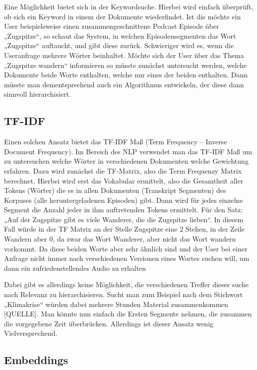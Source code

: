 Eine Möglichkeit bietet sich in der Keywordsuche. 
Hierbei wird einfach überprüft, ob sich ein Keyword in einem der Dokumente wiederfindet. Ist die möchte ein User beispielsweise einen zusammengeschnittene Podcast Episode über „Zugspitze“, so schaut das System, in welchen Episodensegmenten das Wort „Zugspitze“ auftaucht, und gibt diese zurück. 
Schwieriger wird es, wenn die Useranfrage mehrere Wörter beinhaltet. 
Möchte sich der User über das Thema „Zugspitze wandern“ informieren so müsste zunächst untersucht werden, welche Dokumente beide Worte enthalten, welche nur eines der beiden enthalten. 
Dann müsste man dementsprechend auch ein Algorithmus entwickeln, der diese dann sinnvoll hierarchisiert. 

\subsection{TF-IDF}

Einen solchen Ansatz bietet das TF-IDF Maß (Term Frequency – Inverse Document Frequency). 
Im Bereich des NLP verwendet man das TF-IDF Maß um zu untersuchen welche Wörter in verschiedenen Dokumenten welche Gewichtung erfahren. 
Dazu wird zunächst die TF-Matrix, also die Term Frequenzy Matrix berechnet. 
Hierbei wird erst das Vokabular ermittelt, also die Gesamtheit aller Tokens (Wörter) die es in allen Dokumenten (Transkript Segmenten) des Korpuses (alle heruntergeladenen Episoden) gibt. 
Dann wird für jedes einzelne Segment die Anzahl jeder in ihm auftretenden Tokens ermittelt. 
Für den Satz: „Auf der Zugspitze gibt es viele Wanderer, die die Zugspitze lieben“. 
In diesem Fall würde in der TF Matrix an der Stelle Zugspitze eine 2 Stehen, in der Zeile Wandern aber 0, da zwar das Wort Wanderer, aber nicht das Wort wandern vorkommt. 
Da diese beiden Worte aber sehr ähnlich sind und der User bei einer Anfrage nicht immer nach verschiedenen Versionen eines Wortes suchen will, um dann ein zufriedenstellendes Audio zu erhalten


Dabei gibt es allerdings keine Möglichkeit, die verschiedenen Treffer dieser suche nach Relevanz zu hierarchisieren. Sucht man zum Beispiel nach dem Stichwort „Klimakrise“ würden dabei mehrere Stunden Material zusammenkommen [QUELLE]. 
Man könnte nun einfach die Ersten Segmente nehmen, die zusammen die vorgegebene Zeit überbrücken. Allerdings ist dieser Ansatz wenig Vielversprechend. 

\subsection{Embeddings}


